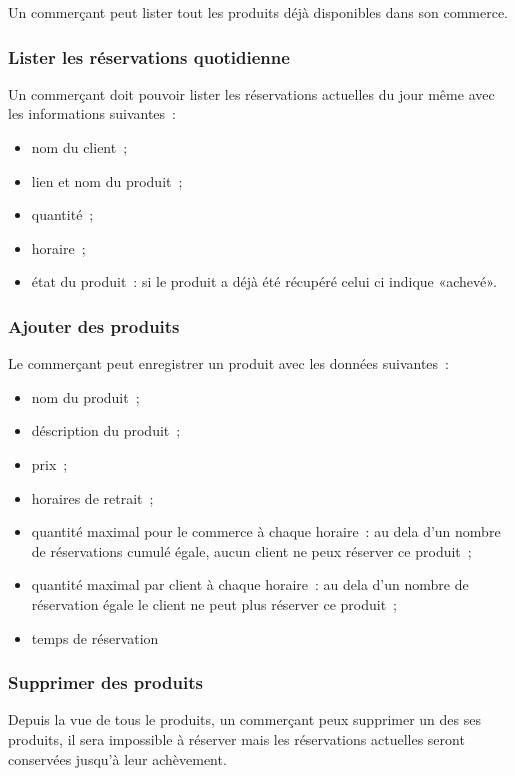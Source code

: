 \documentclass[a4paper,12pt]{article}
\begin{document}
Un commerçant peut lister tout les produits déjà disponibles dans son commerce.

\subsubsection{Lister les réservations quotidienne}

Un commerçant doit pouvoir lister les réservations actuelles du jour même avec les informations suivantes~:

\begin{itemize}
	\item nom du client~;
	\item lien et nom du produit~;
	\item quantité~;
	\item horaire~;
	\item état du produit~: si le produit a déjà été récupéré celui ci indique «achevé».
\end{itemize}

\subsubsection{Ajouter des produits}

Le commerçant peut enregistrer un produit avec les données suivantes~:

\begin{itemize}
	\item nom du produit~;
	\item déscription du produit~;
	\item prix~;
	\item horaires de retrait~;
	\item quantité maximal pour le commerce à chaque horaire~: au dela d'un nombre de réservations cumulé égale, aucun client ne peux réserver ce produit~;
	\item quantité maximal par client à chaque horaire~: au dela d'un nombre de réservation égale le client ne peut plus réserver ce produit~;
	\item temps de réservation 
\end{itemize}


\subsubsection{Supprimer des produits}

Depuis la vue de tous le produits, un commerçant peux supprimer un des ses produits, il sera impossible à réserver mais les réservations actuelles seront conservées jusqu'à leur achèvement.
\end{document}
